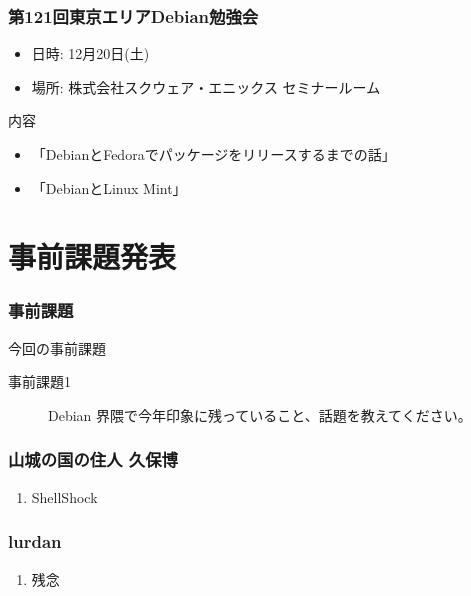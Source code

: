 \documentclass[cjk,dvipdfmx,10pt,compress,%
hyperref={bookmarks=true,bookmarksnumbered=true,bookmarksopen=false,%
colorlinks=false,%
pdftitle={第 92 回 関西 Debian 勉強会},%
pdfauthor={倉敷・のがた・佐々木・かわだ},%
pdfsubject={資料},%
}]{beamer}
\begin{document}
\begin{frame}[fragile]
  \frametitle{第121回東京エリアDebian勉強会}
  \begin{itemize}
  \item 日時: 12月20日(土)
  \item 場所: 株式会社スクウェア・エニックス セミナールーム
  \end{itemize}
  \begin{block}{内容}
    \begin{itemize}
    \item 「DebianとFedoraでパッケージをリリースするまでの話」
    \item 「DebianとLinux Mint」
    \end{itemize}
  \end{block}
\end{frame}


\section{事前課題発表}


\begin{frame}[fragile]
  \frametitle{事前課題}
  \begin{block}{今回の事前課題}
    \begin{description}
    \item[事前課題1]
      Debian 界隈で今年印象に残っていること、話題を教えてください。
    \end{description}
  \end{block}
\end{frame}


\begin{frame}
  \frametitle{ 山城の国の住人 久保博 }
  \begin{enumerate}
  \item ShellShock
  \end{enumerate}
\end{frame}

\begin{frame}
  \frametitle{ lurdan }
  \begin{enumerate}
  \item 残念
  \end{enumerate}
\end{frame}
\end{document}
